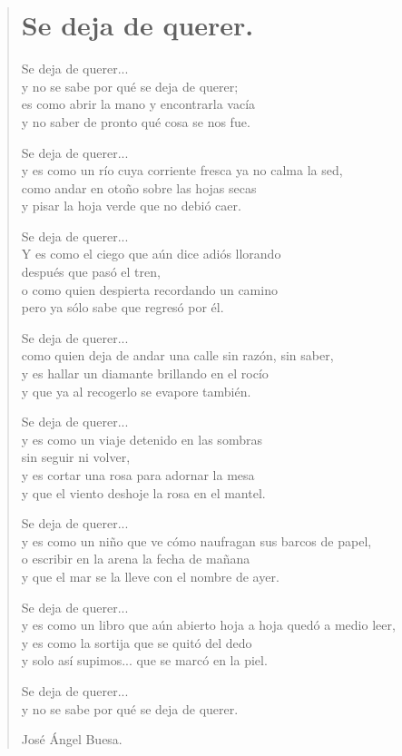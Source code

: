 \documentclass[11pt, portrait, twoside, notitlepage, openright]{book}
\begin{document}
\newpage
\begin{verse}
\begin{center}
\section{Se deja de querer.}
\end{center}
Se deja de querer...\\
y no se sabe por qué se deja de querer;\\
es como abrir la mano y encontrarla vacía\\
y no saber de pronto qué cosa se nos fue.
\newline

Se deja de querer...\\
y es como un río cuya corriente fresca ya no calma la sed,\\
como andar en otoño sobre las hojas secas\\
y  pisar la hoja verde que no debió caer.
\newline

Se deja de querer...\\
Y es como el ciego que aún dice adiós llorando\\
después que pasó el tren,\\
o como quien despierta recordando un camino\\
pero ya sólo sabe que regresó por él.
\newline

Se deja de querer...\\
como quien deja de andar una calle sin razón, sin saber,\\
y es hallar un diamante brillando en el rocío\\
y que ya al recogerlo se evapore también.
\newpage

Se deja de querer...\\
y es como un viaje detenido en las sombras\\
sin seguir ni volver,\\
y es cortar una rosa para adornar la mesa\\
y que el viento deshoje la rosa en el mantel.
\newline

Se deja de querer...\\
y es como un niño que ve cómo naufragan sus barcos de papel,\\
o escribir en la arena la fecha de mañana\\
y que el mar se la lleve con el nombre de ayer.
\newline

Se deja de querer...\\
y es como un libro que aún abierto hoja a hoja quedó a medio leer,\\
y es como la sortija que se quitó del dedo\\
y solo así supimos... que se marcó en la piel.
\newline

Se deja de querer...\\
y no se sabe por qué se deja de querer.
\newline

José Ángel Buesa.
\end{verse}
\end{document}
